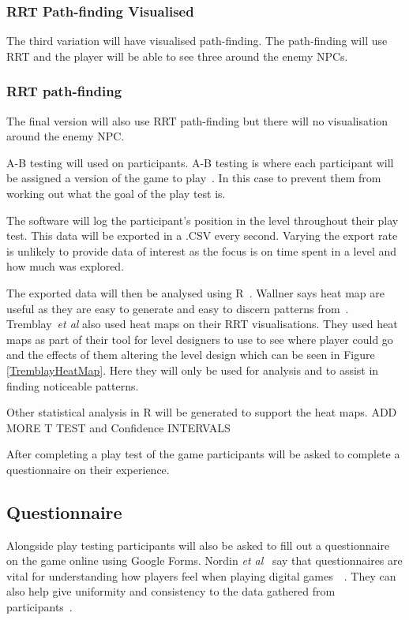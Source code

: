 \documentclass[journal]{IEEEtran}
\begin{document}
\subsubsection{RRT Path-finding Visualised}
The third variation will have visualised path-finding. The path-finding will use RRT and the player will be able to see three around the enemy NPCs.

\subsubsection{RRT path-finding}
The final version will also use RRT path-finding but there will no visualisation around the enemy NPC.

A-B testing will used on participants. A-B testing is where each participant will be assigned a version of the game to play~\cite{Hynninen2014}. In this case to prevent them from working out what the goal of the play test is. 

The software will log the participant's position in the level throughout their play test. This data will be exported in a .CSV every second. Varying the export rate is unlikely to provide data of interest as the focus is on time spent in a level and how much was explored. 

The exported data will then be analysed using R~\cite{software:R}. Wallner says heat map are useful as they are easy to generate and easy to discern patterns from~\cite{Wallner2015}.  Tremblay~\textit{et al} also used heat maps on their RRT visualisations. They used heat maps as part of their tool for level designers to use to see where player could go and the effects of them altering the level design which can be seen in Figure \ref{TremblayHeatMap}. Here they will only be used for analysis and to assist in finding noticeable patterns.

Other statistical analysis in R will be generated to support the heat maps. ADD MORE T TEST and Confidence INTERVALS
 
After completing a play test of the game participants will be asked to complete a questionnaire on their experience.

\subsection{Questionnaire}
Alongside play testing participants will also be asked to fill out a questionnaire on the game online using Google Forms. Nordin \textit{et al}~\cite{nordin2014} say that questionnaires are vital for understanding how players feel when playing digital games~\cite{nordin2014}~\cite{Denisova2016}. They can also help give uniformity and consistency to the data gathered from participants~\cite{Denisova2016}.
\end{document}

